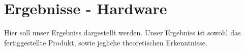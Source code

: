 \chapter{Ergebnisse - Hardware} \label{ergebnisse}

\nocite{*}


Hier soll unser Ergebniss dargestellt werden. Unser Ergebniss ist sowohl das fertiggestellte Produkt, sowie jegliche theoretischen Erkenntnisse.